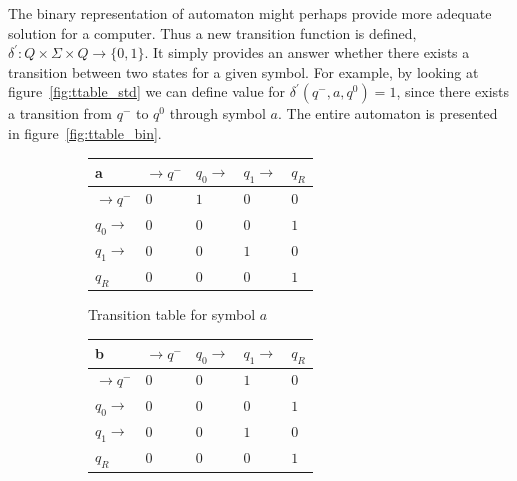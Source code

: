 \documentclass[runningheads, a4paper]{llncs}
\begin{document}
The binary representation of automaton might perhaps provide more adequate solution for a computer. Thus a new transition function is defined, $\delta^{'}: Q \times \Sigma \times Q \rightarrow \{0,1\}$. It simply provides an answer whether there exists a transition between two states for a given symbol. For example, by looking at figure~\ref{fig:ttable_std} we can define value for $\delta^{'}(q^-,a,q^0) = 1$, since there exists a transition from $q^-$ to $q^0$ through symbol $a$. The entire automaton is presented in figure~\ref{fig:ttable_bin}.


%
%
\begin{figure}
\begin{center}

	\setlength{\tabcolsep}{4pt}
	\renewcommand{\arraystretch}{1.4}
	
	\begin{subfigure}{.5\textwidth}

	\centering
	\begin{tabular}{|P{1.0cm} || P{0.8cm} | P{0.8cm} | P{0.8cm} | P{0.8cm}|}

	\hline
	a & $\rightarrow q^-$ & $q_0 \rightarrow$ & $q_1 \rightarrow$ & $q_R$ \\
	\hline
	\hline
	$\rightarrow q^-$ 		& $0$ & $1$ & $0$ & $0$ \\
	\hline
	$q_0 \rightarrow$ 		& $0$ & $0$ & $0$ & $1$ \\
	\hline
	$q_1 \rightarrow$ 		& $0$ & $0$ & $1$ & $0$ \\
	\hline
	$q_R$  					& $0$ & $0$ & $0$ & $1$ \\
	\hline

	\end{tabular}

	\caption{Transition table for symbol $a$}
	\label{fig:ttable_bin_a}	
	
	\end{subfigure}%
	\begin{subfigure}{.5\textwidth}
	
	\centering
	\begin{tabular}{|P{1.0cm} || P{0.8cm} | P{0.8cm} | P{0.8cm} | P{0.8cm}|}
	
	\hline
	b & $\rightarrow q^-$ & $q_0 \rightarrow$ & $q_1 \rightarrow$ & $q_R$ \\
	\hline
	\hline
	$\rightarrow q^-$ 		& $0$ & $0$ & $1$ & $0$ \\
	\hline
	$q_0 \rightarrow$ 		& $0$ & $0$ & $0$ & $1$ \\
	\hline
	$q_1 \rightarrow$ 		& $0$ & $0$ & $1$ & $0$ \\
	\hline
	$q_R$  					& $0$ & $0$ & $0$ & $1$ \\
	\hline


\end{tabular}
\end{subfigure}
\end{center}
\end{figure}
\end{document}
